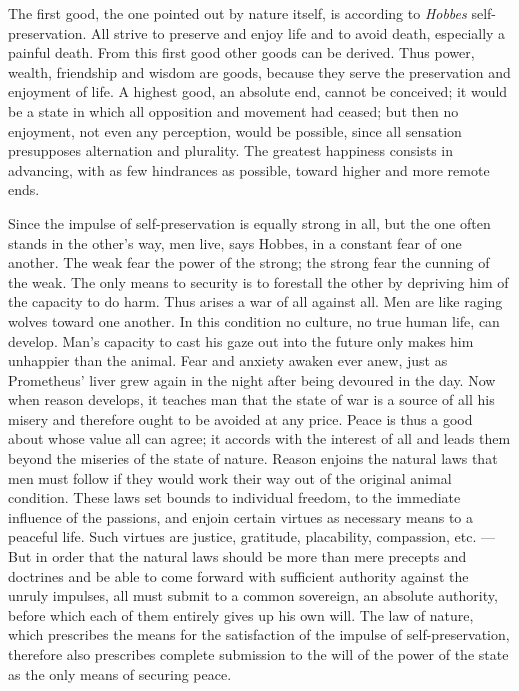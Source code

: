 \documentclass[12pt,a4paper,openany]{book}
\newcommand{\opage}[1]{\marginnote{\footnotesize\textit{[#1]}}}
\begin{document}
The first good, the one pointed out by nature itself, is according to
\emph{Hobbes} self-preservation. All strive to preserve and enjoy life and to
avoid death, especially a painful death. From this first good other goods can
be derived. Thus power, wealth, friendship and wisdom are goods, because they
serve the preservation and enjoyment of life. A highest good, an absolute end,
cannot be conceived; it would be a state in which all opposition and movement
had ceased; but then \opage{22}no enjoyment, not even any perception, would be
possible, since all sensation presupposes alternation and plurality. The
greatest happiness consists in advancing, with as few hindrances as possible,
toward higher and more remote ends.

Since the impulse of self-preservation is equally strong in all, but the one
often stands in the other's way, men live, says Hobbes, in a constant fear of
one another. The weak fear the power of the strong; the strong fear the
cunning of the weak. The only means to security is to forestall the other by
depriving him of the capacity to do harm. Thus arises a war of all against
all. Men are like raging wolves toward one another. In this condition no
culture, no true human life, can develop. Man's capacity to cast his gaze out
into the future only makes him unhappier than the animal. Fear and anxiety
awaken ever anew, just as Prometheus' liver grew again in the night after
being devoured in the day. Now when reason develops, it teaches man that the
state of war is a source of all his misery and therefore ought to be avoided
at any price. Peace is thus a good about whose value all can agree; it accords
with the interest of all and leads them beyond the miseries of the state of
nature. Reason enjoins the natural laws that men must follow if they would
work their way out of the original animal condition. These laws set bounds to
individual freedom, to the immediate influence of the passions, and enjoin
certain virtues \opage{23}as necessary means to a peaceful life. Such virtues
are justice, gratitude, placability, compassion, etc. --- But in order that
the natural laws should be more than mere precepts and doctrines and be able
to come forward with sufficient authority against the unruly impulses, all
must submit to a common sovereign, an absolute authority, before which each of
them entirely gives up his own will. The law of nature, which prescribes the
means for the satisfaction of the impulse of self-preservation, therefore also
prescribes complete submission to the will of the power of the state as the
only means of securing peace.
\end{document}
